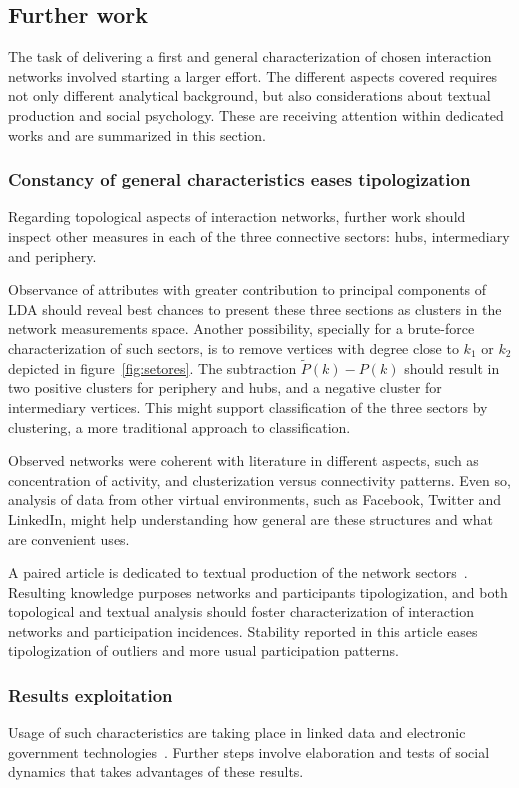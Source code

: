 \documentclass[%
 aip,
 jmp,%
 amsmath,amssymb,
 reprint,%
]{revtex4-1}
\begin{document}
    \subsection{Further work}
The task of delivering a first and general characterization of chosen interaction networks involved starting a larger effort. The different aspects covered requires not only different analytical background, but also considerations about textual production and social psychology. These are receiving attention within dedicated works and are summarized in this section.

        \subsubsection{Constancy of general characteristics eases tipologization}

Regarding topological aspects of interaction networks, further work should inspect other measures in each of the three connective sectors: hubs, intermediary and periphery.

Observance of attributes with greater contribution to principal components of LDA should reveal best chances to present these three sections as clusters in the network measurements space. Another possibility, specially for a brute-force characterization of such sectors, is to remove vertices with degree close to $k_1$ or $k_2$ depicted in figure~\ref{fig:setores}. The subtraction $\widetilde{P}(k)-P(k)$ should result in two positive clusters for periphery and hubs, and a negative cluster for intermediary vertices. This might support classification of the three sectors by clustering, a more traditional approach to classification.

Observed networks were coherent with literature in different aspects, such as concentration of activity, and clusterization versus connectivity patterns. Even so, analysis of data from other virtual environments, such as Facebook, Twitter and LinkedIn, might help understanding how general are these structures and what are convenient uses.

A paired article  is dedicated to textual production of the network sectors~\cite{rcText}. Resulting knowledge purposes networks and participants tipologization, and both topological and textual analysis should foster characterization of interaction networks and participation incidences.
Stability reported in this article eases tipologization of outliers and more usual participation patterns.

        \subsubsection{Results exploitation}
Usage of such characteristics are taking place in linked data and electronic government technologies~\cite{ops,opa,ensaio}. Further steps involve elaboration and tests of social dynamics that takes advantages of these results.
\end{document}
